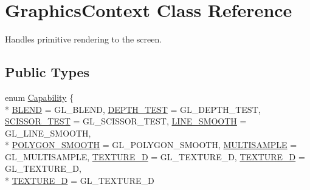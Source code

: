 \hypertarget{class_graphics_context}{\section{Graphics\+Context Class Reference}
\label{class_graphics_context}
}


Handles primitive rendering to the screen.  


\subsection*{Public Types}
\begin{DoxyCompactItemize}
\item 
enum \hyperlink{class_graphics_context_a4171335401279aad7e5a463349c093c6}{Capability} \{ \\*
\hyperlink{class_graphics_context_a4171335401279aad7e5a463349c093c6a6ab28e2ebc774a58674a758d3eb36f77}{B\+L\+E\+N\+D} = G\+L\+\_\+\+B\+L\+E\+N\+D, 
\hyperlink{class_graphics_context_a4171335401279aad7e5a463349c093c6ac3185f6b39d7b321f70d5ac940d68753}{D\+E\+P\+T\+H\+\_\+\+T\+E\+S\+T} = G\+L\+\_\+\+D\+E\+P\+T\+H\+\_\+\+T\+E\+S\+T, 
\hyperlink{class_graphics_context_a4171335401279aad7e5a463349c093c6ad87117d28b8360371e6fb569b8a3eb46}{S\+C\+I\+S\+S\+O\+R\+\_\+\+T\+E\+S\+T} = G\+L\+\_\+\+S\+C\+I\+S\+S\+O\+R\+\_\+\+T\+E\+S\+T, 
\hyperlink{class_graphics_context_a4171335401279aad7e5a463349c093c6a7d858d33ebc84491a6975f18e18e46e5}{L\+I\+N\+E\+\_\+\+S\+M\+O\+O\+T\+H} = G\+L\+\_\+\+L\+I\+N\+E\+\_\+\+S\+M\+O\+O\+T\+H, 
\\*
\hyperlink{class_graphics_context_a4171335401279aad7e5a463349c093c6aa031b875b0d466f02da9da5f6b05c15a}{P\+O\+L\+Y\+G\+O\+N\+\_\+\+S\+M\+O\+O\+T\+H} = G\+L\+\_\+\+P\+O\+L\+Y\+G\+O\+N\+\_\+\+S\+M\+O\+O\+T\+H, 
\hyperlink{class_graphics_context_a4171335401279aad7e5a463349c093c6a55dc7e0010e82c2aaeb833279724a7b2}{M\+U\+L\+T\+I\+S\+A\+M\+P\+L\+E} = G\+L\+\_\+\+M\+U\+L\+T\+I\+S\+A\+M\+P\+L\+E, 
\hyperlink{class_graphics_context_a4171335401279aad7e5a463349c093c6a4f0e9b2b99e86486d92c7b5f5a92ab76}{T\+E\+X\+T\+U\+R\+E\+\_\+D} = G\+L\+\_\+\+T\+E\+X\+T\+U\+R\+E\+\_\+D, 
\hyperlink{class_graphics_context_a4171335401279aad7e5a463349c093c6a3e47363105c3d592ed1667da0b97ad55}{T\+E\+X\+T\+U\+R\+E\+\_\+D} = G\+L\+\_\+\+T\+E\+X\+T\+U\+R\+E\+\_\+D, 
\\*
\hyperlink{class_graphics_context_a4171335401279aad7e5a463349c093c6a85164b8505d0d5edf7f21c4a182d057b}{T\+E\+X\+T\+U\+R\+E\+\_\+D} = G\+L\+\_\+\+T\+E\+X\+T\+U\+R\+E\+\_\+D

\end{DoxyCompactItemize}
